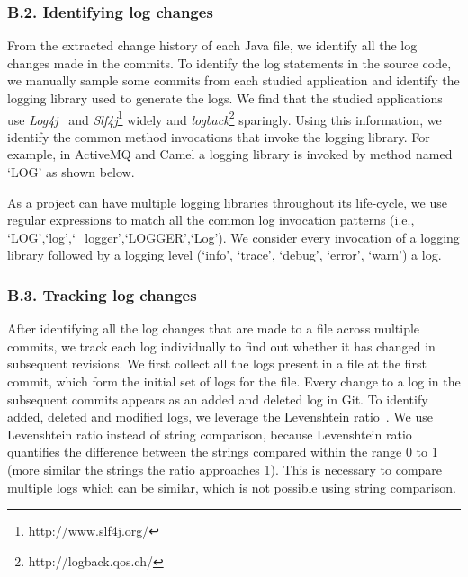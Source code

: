 \subsubsection*{B.2. Identifying log changes}
From the extracted change history of each {Java} file, we identify all the log changes made in the commits. To identify the log statements in the source code, we manually sample some commits from each studied application and identify the logging library used to generate the logs. We find that the studied applications use \textsl{Log4j}~\cite{EMSEIAN} and \textsl{Slf4j}\footnote{http://www.slf4j.org/} widely and \textsl{logback}\footnote{http://logback.qos.ch/} sparingly. Using this information, we identify the common method invocations that invoke the logging library. For example, in  ActiveMQ and Camel a logging library is invoked by method named `LOG' as shown below.


As a project can have multiple logging libraries throughout its life-cycle, we use regular expressions to match all the common log invocation patterns (i.e., `LOG',`log',`\_logger',`LOGGER',`Log'). We consider every invocation of a logging library followed by a logging level (`info', `trace', `debug', `error', `warn') a log.


\subsubsection*{B.3. Tracking log changes}
After identifying all the log changes that are made to a file across multiple commits, we track each log individually to find out whether it has changed in subsequent revisions. We first collect all the logs present in a file at the first commit, which form the initial set of logs for the file. Every change to a log in the subsequent commits appears as an added and deleted log in Git. To identify added, deleted and modified logs, we leverage the Levenshtein ratio~\cite{levenshteinratio}. We use Levenshtein ratio instead of string comparison, because Levenshtein ratio quantifies the difference between the strings compared within the range 0 to 1 (more similar the strings the ratio approaches 1). This is necessary to compare multiple logs which can be similar, which is not possible using string comparison.




